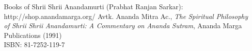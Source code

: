 \documentclass[12pt,letterpaper]{book}
\begin{document}
\begin{thebibliography}{99}
Books of Shrii Shrii Anandamurti (Prabhat Ranjan Sarkar): \\
http://shop.anandamarga.org/
Avtk. Ananda Mitra Ac., \emph{The Spiritual Philosophy of Shrii Shrii Anandamurti: A Commentary on Ananda Sutram}, Ananda Marga Publications (1991) \\
ISBN: 81-7252-119-7
\end{thebibliography}
\end{document}

